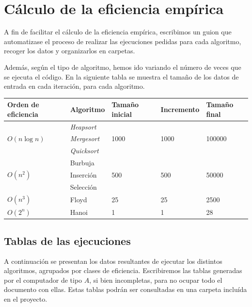 \documentclass[a4paper, 11pt]{article}
\begin{document}
\section{Cálculo de la eficiencia empírica}
A fin de facilitar el cálculo de la eficiencia empírica, escribimos un guion que automatizase el proceso de realizar las ejecuciones pedidas para cada algoritmo, recoger los datos y organizarlos en carpetas. %





Además, según el tipo de algoritmo, hemos ido variando el número de veces que se ejecuta el código.
En la siguiente tabla se muestra el tamaño de los datos de entrada en cada iteración, para cada algoritmo.

\begin{tabular}{lllll}
	Orden de eficiencia & Algoritmo & Tamaño inicial & Incremento & Tamaño final\\ \midrule
	\multirow{3}{*}{$O(n\log n)$} & \textit{Heapsort} & \multirow{3}{*}{1000} & \multirow{3}{*}{1000} & \multirow{3}{*}{100000} \\
	& \textit{Mergesort} & & &\\
	& \textit{Quicksort} & & &\\ \midrule
	\multirow{3}{*}{$O\left(n^2\right)$} & Burbuja & \multirow{3}{*}{500} & \multirow{3}{*}{500} & \multirow{3}{*}{50000} \\
	& Inserción & & &\\
	& Selección & & &\\ \midrule
	$O\left(n^3\right)$ & Floyd & 25 & 25 & 2500 \\\midrule
	$O\left(2^n\right)$ & Hanoi & 1 & 1 & 28
	
\end{tabular}

\subsection{Tablas de las ejecuciones}
A continuación se presentan los datos resultantes de ejecutar los distintos algoritmos, agrupados por clases de eficiencia. Escribiremos  las tablas generadas por el computador de tipo $A$, si bien incompletas, para no ocupar todo el documento con ellas. Estas tablas podrán ser consultadas en una carpeta incluída en el proyecto.
\end{document}
